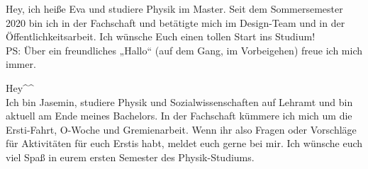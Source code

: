 \begin{multicols}{2}
\vspace{-1.2cm}

{
Hey, ich heiße Eva und studiere Physik im Master. Seit dem Sommersemester 2020 bin ich in der Fachschaft und betätigte mich im Design-Team und in der Öffentlichkeitsarbeit.
Ich wünsche Euch einen tollen Start ins Studium! \\ PS: Über ein freundliches „Hallo“ (auf dem Gang, im Vorbeigehen) freue ich mich immer.
} 



{
Hey\textasciicircum\textasciicircum \\
Ich bin Jasemin, studiere Physik und Sozialwissenschaften auf Lehramt und bin aktuell am Ende meines Bachelors. In der Fachschaft kümmere ich mich um die Ersti-Fahrt, O-Woche und Gremienarbeit. Wenn ihr also Fragen oder Vorschläge für Aktivitäten für euch Erstis habt, meldet euch gerne bei mir. 
Ich wünsche euch viel Spaß in eurem ersten Semester des Physik-Studiums.
}


\end{multicols}
